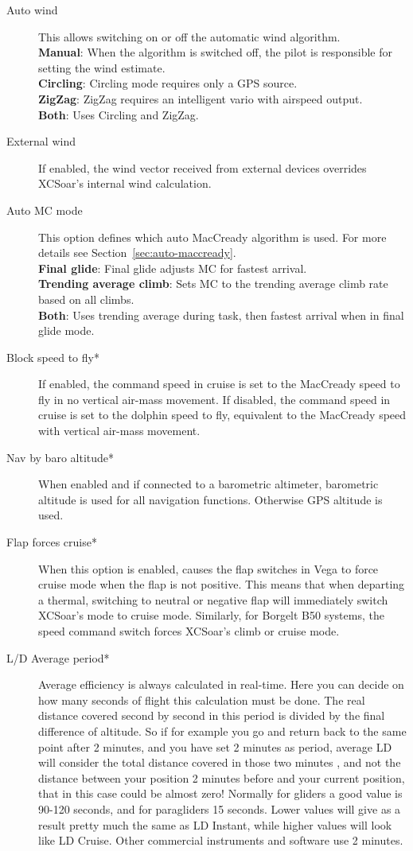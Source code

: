\begin{description}
\item[Auto wind]  \label{conf:autowind} This allows switching on or off the
  automatic wind algorithm. \\
  {\bf Manual}: When the algorithm is switched off, the pilot is responsible for
  setting the wind estimate. \\
  {\bf Circling}: Circling mode requires only a GPS source. \\
  {\bf ZigZag}: ZigZag requires an intelligent vario with airspeed output. \\
  {\bf Both}:  Uses Circling and ZigZag.
\item[External wind]  If enabled, the wind vector received from external
  devices overrides XCSoar's internal wind calculation.
\item[Auto MC mode]  This option defines which auto MacCready algorithm is used.
  For more details see Section~\ref{sec:auto-maccready}. \\
  {\bf Final glide}: Final glide adjusts MC for fastest arrival. \\
  {\bf Trending average climb}: Sets MC to the trending average climb rate based 
  on all climbs. \\
  {\bf Both}: Uses trending average during task, then fastest arrival when in final 
  glide mode.
\item[Block speed to fly*]  If enabled, the command speed in cruise
  is set to the MacCready speed to fly in no vertical air-mass movement.
  If disabled, the command speed in cruise is set to the dolphin speed to fly,
  equivalent to the MacCready speed with vertical air-mass movement.
\item[Nav by baro altitude*]  When enabled and if connected to a barometric
  altimeter, barometric altitude is used for all navigation functions. Otherwise
  GPS altitude is used.
\item[Flap forces cruise*]
  When this option is enabled, causes the flap switches in Vega to
  force cruise mode when the flap is not positive. This means that
  when departing a thermal, switching to neutral or negative flap will
  immediately switch XCSoar's mode to cruise mode.
  Similarly, for Borgelt B50 systems, the speed command switch forces
  XCSoar's climb or cruise mode.
\item[L/D Average period*]  Average efficiency is always calculated in real-time. 
  Here you can decide on how many seconds of flight this calculation must be done. 
  The real distance covered second by second in this period is divided by the final 
  difference of altitude.  So if for example you go and return back to the same point 
  after 2 minutes, and you have set 2 minutes as period, average LD will consider the 
  total distance covered in those two minutes , and not the distance between your 
  position 2 minutes before and your current position, that in this case could be 
  almost zero! Normally for gliders a good value is 90-120 seconds, and for paragliders 
  15 seconds. Lower values will give as a result pretty much the same as LD Instant, 
  while higher values will look like LD Cruise. Other commercial instruments and 
  software use 2 minutes.
\end{description}



